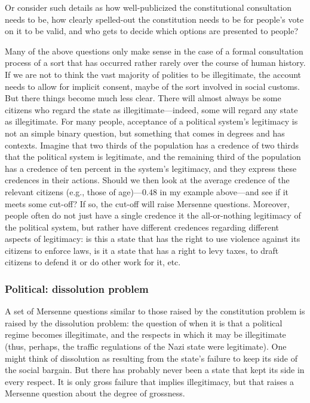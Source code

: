 Or consider such details as how well-publicized the constitutional consultation needs to be, how clearly spelled-out the 
constitution needs to be for people's vote on it to be valid, and who gets to decide which options are presented to people?

Many of the above questions only make sense in the case of a formal consultation process of a sort that has occurred rather
rarely over the course of human history. If we are not to think the vast majority of polities to be illegitimate, the account
needs to allow for implicit consent, maybe of the sort involved in social customs. But there things become much less clear.
There will almost always be some citizens who regard the state as illegitimate---indeed, some will regard any state 
as illegitimate. For many people, acceptance of a political system's legitimacy is not an simple binary question, but 
something that comes in degrees and has contexts. Imagine that two thirds of the population has a credence of two thirds
that the political system is legitimate, and the remaining third of the population has a credence of ten percent in 
the system's legitimacy, and they express these credences in their actions. Should we then look at the average credence
of the relevant citizens (e.g., those of age)---$0.48$ in my example above---and see if it meets some cut-off? If so, the
cut-off will raise Mersenne questions. Moreover, people often do not just have a single credence it the all-or-nothing 
legitimacy of the political system, but rather have different credences regarding different aspects of legitimacy: is this
a state that has the right to use violence against its citizens to enforce laws, is it a state that has a right to levy taxes,
to draft citizens to defend it or do other work for it, etc.

\subsubsection{Political: dissolution problem}
A set of Mersenne questions similar to those raised by the constitution problem is raised by the dissolution problem: the question
of when it is that a political regime becomes illegitimate, and the respects in which it may be illegitimate (thus, perhaps, the
traffic regulations of the Nazi state were legitimate). One might think of dissolution as resulting from the state's failure to
keep its side of the social bargain. But there has probably never been a state that kept its side in every respect. It is only
gross failure that implies illegitimacy, but that raises a Mersenne question about the degree of grossness.

